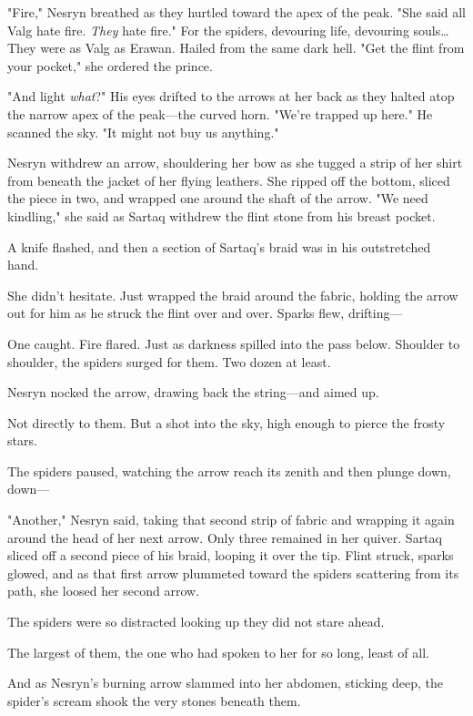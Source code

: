 "Fire," Nesryn breathed as they hurtled toward the apex of the peak.
"She said all Valg hate fire.
\emph{They} hate fire."
For the spiders, devouring life, devouring souls\ldots They were as Valg as Erawan.
Hailed from the same dark hell.
"Get the flint from your pocket," she ordered the prince.

"And light \emph{what}?"
His eyes drifted to the arrows at her back as they halted atop the narrow apex of the peak---the curved horn.
"We're trapped up here."
He scanned the sky.
"It might not buy us anything."

Nesryn withdrew an arrow, shouldering her bow as she tugged a strip of her shirt from beneath the jacket of her flying leathers.
She ripped off the bottom, sliced the piece in two, and wrapped one around the shaft of the arrow.
"We need kindling," she said as Sartaq withdrew the flint stone from his breast pocket.

A knife flashed, and then a section of Sartaq's braid was in his outstretched hand.

She didn't hesitate.
Just wrapped the braid around the fabric, holding the arrow out for him as he struck the flint over and over.
Sparks flew, drifting---

One caught.
Fire flared.
Just as darkness spilled into the pass below.
Shoulder to shoulder, the spiders surged for them.
Two dozen at least.

Nesryn nocked the arrow, drawing back the string---and aimed up.

Not directly to them.
But a shot into the sky, high enough to pierce the frosty stars.

The spiders paused, watching the arrow reach its zenith and then plunge down, down---

"Another," Nesryn said, taking that second strip of fabric and wrapping it again around the head of her next arrow.
Only three remained in her quiver.
Sartaq sliced off a second piece of his braid, looping it over the tip.
Flint struck, sparks glowed, and as that first arrow plummeted toward the spiders scattering from its path, she loosed her second arrow.

The spiders were so distracted looking up they did not stare ahead.

The largest of them, the one who had spoken to her for so long, least of all.

And as Nesryn's burning arrow slammed into her abdomen, sticking deep, the spider's scream shook the very stones beneath them.


